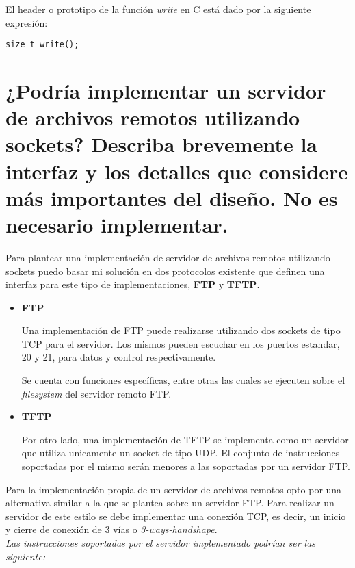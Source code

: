 \documentclass[osajnl,twocolumn,showpacs,superscriptaddress,10pt]{revtex4-1} %
\begin{document}
El header o prototipo de la función \textit{write} en C está dado por la siguiente expresión:

\begin{verbatim}
size_t write();   
\end{verbatim}

\section{¿Podría implementar un servidor de archivos remotos utilizando sockets? Describa brevemente la interfaz y los detalles que considere más importantes del diseño. No es necesario implementar.}

Para plantear una implementación de servidor de archivos remotos utilizando sockets puedo basar mi solución en dos protocolos existente que definen una interfaz para este tipo de implementaciones, \textbf{FTP} y \textbf{TFTP}.

\begin{itemize}
    \item \textbf{FTP}
    
    Una implementación de FTP puede realizarse utilizando dos sockets de tipo TCP para el servidor. Los mismos pueden escuchar en los puertos estandar, 20 y 21, para datos y control respectivamente.
    
    Se cuenta con funciones específicas, entre otras las cuales se ejecuten sobre el \textit{filesystem} del servidor remoto FTP.
    
    \item \textbf{TFTP}
    
    Por otro lado, una implementación de TFTP se implementa como un servidor que utiliza unicamente un socket de tipo UDP. El conjunto de instrucciones soportadas por el mismo serán menores a las soportadas por un servidor FTP.
\end{itemize}

Para la implementación propia de un servidor de archivos remotos opto por una alternativa similar a la que se plantea sobre un servidor FTP. Para realizar un servidor de este estilo se debe implementar una conexión TCP, es decir, un inicio y cierre de conexión de 3 vías o \textit{3-ways-handshape}. \\

\textit{Las instrucciones soportadas por el servidor implementado podrían ser las siguiente:}
\end{document}

